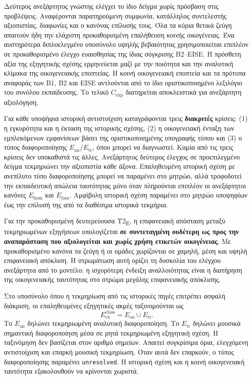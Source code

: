 \documentclass[11pt,a4paper]{article}
\begin{document}
Δεύτερος ανεξάρτητος γνώστης ελέγχει το ίδιο δείγμα χωρίς πρόσβαση στις προβλέψεις. Αναφέρονται παρατηρούμενη συμφωνία, κατάλληλος συντελεστής αξιοπιστίας, διαφωνίες και ο κανόνας επίλυσής τους. Όλα τα κύρια θετικά ζεύγη απαιτούν ήδη την ελάχιστη προκαθορισμένη επαλήθευση κοινής οικογένειας. Ένα αυστηρότερα διπλοελεγμένο υποσύνολο υψηλής βεβαιότητας χρησιμοποιείται επιπλέον σε προκαθορισμένο έλεγχο ευαισθησίας της ίδιας σύγκρισης B2--EISE. Η πρόσθετη αξία της εξηγητικής σχέσης ερμηνεύεται μαζί με την ποιότητα και την αναλυτική κλίμακα της οικογενειακής εποπτείας. Η κοινή οικογενειακή εποπτεία και τα πρότυπα αναφοράς των B1, B2 και EISE αντλούνται από το ίδιο οριστικοποιημένο λεξιλόγιο του συνόλου εκπαίδευσης. Το τελικό $C_{\mathrm{exp}}$ διατηρείται αποκλειστικά για ανεξάρτητη αξιολόγηση.

Για κάθε υποψήφια ιστορική αντιστοίχιση καταγράφονται τρεις \textbf{διακριτές} κρίσεις: (1) η εγκυρότητα και η έκταση της ιστορικής σχέσης, (2) η οικογενειακή ένταξη των εμπλεκόμενων εμφανίσεων βάσει της οριστικοποιημένης υπογραφής τύπου και (3) ο τύπος διαφοροποίησης $E_{\mathrm{an}}/E_{\mathrm{tr}}$, όπου μπορεί να διαγνωστεί. Καμία από τις τρεις κρίσεις δεν υποκαθιστά τις άλλες. Ανεξάρτητος δεύτερος έλεγχος σε προεπιλεγμένο δείγμα τεκμηριώνει την αξιοπιστία κάθε άξονα. Επαληθευμένη ιστορική σχέση με ανεπίλυτο τύπο διαφοροποίησης μπορεί να παραμένει στο μητρώο, αλλά τροφοδοτεί την εκπαιδευτική απώλεια ταυτότητας μόνο όταν πληρούνται επιπλέον οι ανεξάρτητοι κανόνες $E_{\mathrm{hom}}$ και $E_{\mathrm{fam}}$. Αμφίβολη ιστορική σχέση παραμένει στο μητρώο υποψηφίων έως την επίλυσή της από τα διαθέσιμα ιστορικά τεκμήρια.

Για την προκαθορισμένη δευτερεύουσα Υ2\textsubscript{E}, η επιφανειακή απόσταση μεταξύ τεκμηριωμένων εξηγήσεων υπολογίζεται \textbf{σε συντεταγμένη ουδέτερη ως προς την αναπαράσταση που αξιολογείται και χωρίς χρήση ετικετών οικογένειας}. Με προκαθορισμένο κανόνα τα ζεύγη ή οι ομάδες χωρίζονται σε χαμηλή, μέση και υψηλή επιφανειακή απόκλιση. Η στρωμάτωση αυτή ορίζει τη δυσκολία του ελέγχου ανεξάρτητα από το μοντέλο: η ισχυρότερη ένδειξη αναλλοιότητας είναι η διατήρηση της οικογενειακής ταυτότητας στο στρώμα μεγάλης επιφανειακής απόκλισης.

Στο υποσύνολο όπου η τεκμηρίωση από τις ιστορικές πηγές επιτρέπει ασφαλή διάκριση, οι επαληθευμένες εξηγητικές ακμές ταξινομούνται ως
\[
E_{\mathrm{ex}}^{\mathrm{class}}=E_{\mathrm{an}}\cup E_{\mathrm{tr}}.
\]
Το $E_{\mathrm{an}}$ δηλώνει τεκμηριωμένη αναλυτική διαφοροποίηση. Το $E_{\mathrm{tr}}$ δηλώνει μουσικά σημαντική διαφοροποίηση μέσα σε ρητά τεκμηριωμένη εξηγητική σχέση. Η ταξινόμηση δεν βασίζεται στον αριθμό σημείων. Απαιτεί συγκρίσιμα όρια, ελεγχόμενη αντιστοίχιση και επαρκή μουσική τεκμηρίωση. Όταν αυτά δεν επαρκούν, ο τύπος διαφοροποίησης παραμένει \texttt{unresolved}. Η ιστορική σχέση και η κοινή οικογενειακή ταυτότητα εξακολουθούν να κρίνονται χωριστά.
\end{document}

